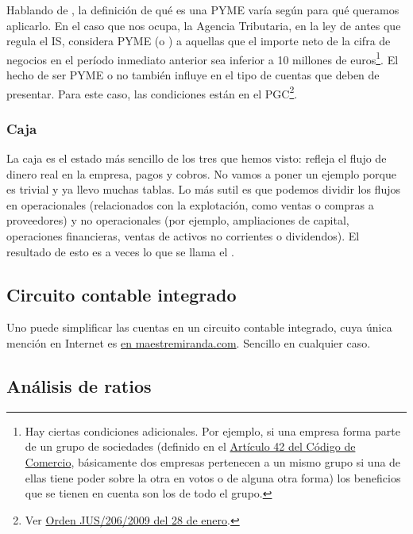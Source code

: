 \documentclass[nochap,palatino,notitlepage]{apuntes}
\begin{document}
Hablando de , la definición de qué es una PYME varía según para qué queramos aplicarlo. En el caso que nos ocupa, la Agencia Tributaria, en la ley de antes que regula el IS, considera PYME (o ) a aquellas que el importe neto de la cifra de negocios en el período inmediato anterior sea inferior a 10 millones de euros\footnote{Hay ciertas condiciones adicionales. Por ejemplo, si una empresa forma parte de un grupo de sociedades (definido en el \href{https://www.boe.es/buscar/act.php?id=BOE-A-1885-6627&tn=1&vd=&p=20150721}{Artículo 42 del Código de Comercio}, básicamente dos empresas pertenecen a un mismo grupo si una de ellas tiene poder sobre la otra en votos o de alguna otra forma) los beneficios que se tienen en cuenta son los de todo el grupo.}. El hecho de ser PYME o no también influye en el tipo de cuentas que deben de presentar. Para este caso, las condiciones están en el PGC\footnote{Ver \href{https://www.boe.es/boe/dias/2009/02/10/pdfs/BOE-A-2009-2276.pdf}{Orden JUS/206/2009 del 28 de enero}.}.

\subsubsection{Caja}

La caja es el estado más sencillo de los tres que hemos visto: refleja el flujo de dinero real en la empresa, pagos y cobros. No vamos a poner un ejemplo porque es trivial y ya llevo muchas tablas. Lo más sutil es que podemos dividir los flujos en operacionales (relacionados con la explotación, como ventas o compras a proveedores) y no operacionales (por ejemplo, ampliaciones de capital, operaciones financieras, ventas de activos no corrientes o dividendos). El resultado de esto es a veces lo que se llama el .

\subsection{Circuito contable integrado}

Uno puede simplificar las cuentas en un circuito contable integrado, cuya única mención en Internet es \href{http://maestremiranda.com/techdir/wp-content/uploads/2015/10/CircuitoContable.pdf}{en maestremiranda.com}. Sencillo en cualquier caso.

\subsection{Análisis de ratios}
\end{document}
